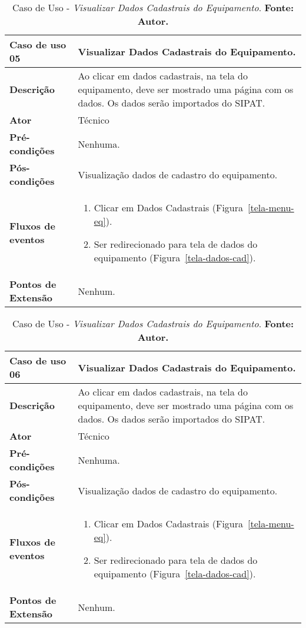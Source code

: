 \begin{apendicesenv}
\begin{table}[H]
\centering
\caption{Caso de Uso - \textit{Visualizar Dados Cadastrais do Equipamento}. \textbf{Fonte: Autor.}}
\label{uc05}
\begin{tabular}{ | p{5cm} | p{10cm} |  }
\hline
	\textbf{Caso de uso 05} & Visualizar Dados Cadastrais do Equipamento. \\ \hline
	\textbf{Descrição} & Ao clicar em dados cadastrais, na tela do equipamento, deve ser mostrado uma página com os dados. Os dados serão importados do SIPAT. \\ \hline
	\textbf{Ator} & Técnico \\ \hline
	\textbf{Pré-condições} & Nenhuma. \\ \hline
	\textbf{Pós-condições} & Visualização dados de cadastro do equipamento. \\ \hline
	\textbf{Fluxos de eventos} & \begin{enumerate}
									\item Clicar em Dados Cadastrais (Figura~\ref{tela-menu-eq}).    
									\item Ser redirecionado para tela de dados do equipamento (Figura~\ref{tela-dados-cad}).
								 \end{enumerate}   \\ \hline
	\textbf{Pontos de Extensão} & Nenhum. \\ \hline
\end{tabular}
\end{table}


\begin{table}[H]
\centering
\caption{Caso de Uso - \textit{Visualizar Dados Cadastrais do Equipamento}. \textbf{Fonte: Autor.}}
\label{uc06}
\begin{tabular}{ | p{5cm} | p{10cm} |  }
\hline
	\textbf{Caso de uso 06} & Visualizar Dados Cadastrais do Equipamento. \\ \hline
	\textbf{Descrição} & Ao clicar em dados cadastrais, na tela do equipamento, deve ser mostrado uma página com os dados. Os dados serão importados do SIPAT. \\ \hline
	\textbf{Ator} & Técnico \\ \hline
	\textbf{Pré-condições} & Nenhuma. \\ \hline
	\textbf{Pós-condições} & Visualização dados de cadastro do equipamento. \\ \hline
	\textbf{Fluxos de eventos} & \begin{enumerate}
									\item Clicar em Dados Cadastrais (Figura~\ref{tela-menu-eq}).    
									\item Ser redirecionado para tela de dados do equipamento (Figura~\ref{tela-dados-cad}).
								 \end{enumerate}   \\ \hline
	\textbf{Pontos de Extensão} & Nenhum. \\ \hline
\end{tabular}
\end{table}


\end{apendicesenv}
